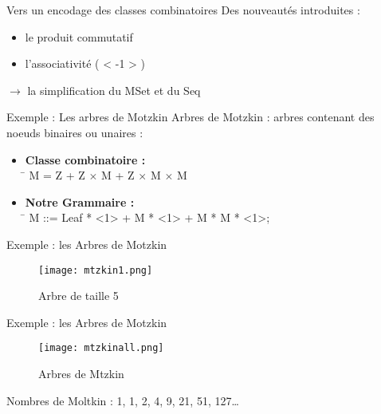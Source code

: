 \documentclass{beamer}
\begin{document}
\begin{frame}{Vers un encodage des classes combinatoires}
Des nouveautés introduites :
\begin{itemize}
\item le produit commutatif
\item l'associativité ( < -1 > )
\end{itemize}
$\rightarrow$ la simplification du MSet et du Seq
\end{frame}


\begin{frame}{Exemple : Les arbres de Motzkin}
Arbres de Motzkin : arbres contenant des noeuds binaires ou unaires :
\begin{itemize}
\item
\begin{tabbing}
\textbf{Classe combinatoire :} \\
\hspace{0.5cm} \= \kill
\> M = Z + Z $\times$ M + Z $\times$ M $\times$ M \\
\end{tabbing}
\item
\begin{tabbing}
\textbf{Notre Grammaire :} \\
\hspace{0.5cm} \= \kill
\hspace{0.5cm} 
\> M ::= Leaf * <1> + M * <1> + M * M * <1>; \\
\end{tabbing}
\end{itemize} 
\end{frame}


\begin{frame}{Exemple : les Arbres de Motzkin}
\begin{figure}[h]
  \centering
  \texttt{[image: mtzkin1.png]}
  \caption{Arbre de taille 5}
\end{figure}
\end{frame}



\begin{frame}{Exemple : les Arbres de Motzkin}
\begin{figure}[h]
  \centering
  \texttt{[image: mtzkinall.png]}
  \caption{Arbres de Mtzkin}
\end{figure}
Nombres de Moltkin : 1, 1, 2, 4, 9, 21, 51, 127\ldots
\end{frame}
\end{document}
